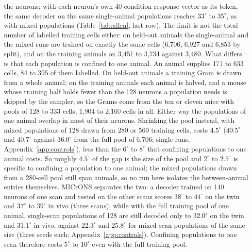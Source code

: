 \documentclass[11pt]{article}
\begin{document}
the neurons: with each neuron's own 40-condition response vector as its token, the same decoder on the same single-animal populations reaches $33^\circ$ to $35^\circ$, as with mixed populations (Table~\ref{tab:allen}, last row). The limit is not the total number of labelled training cells either: on held-out animals the single-animal and the mixed runs are trained on exactly the same cells (6,706, 6,927 and 6,853 by split), and on the training animals on 3,451 to 3,734 against 3,480. What differs is that each population is confined to one animal. An animal supplies 171 to 633 cells, 84 to 395 of them labelled. On held-out animals a training Gram is drawn from a whole animal; on the training animals each animal is halved, and a mouse whose training half holds fewer than the 128 neurons a population needs is skipped by the sampler, so the Grams come from the ten or eleven mice with pools of 128 to 333 cells, 1,904 to 2,160 cells in all. Either way the populations of one animal overlap in most of their neurons. Shrinking the pool instead, with mixed populations of 128 drawn from 280 or 560 training cells, costs $4.5^\circ$ ($40.5^\circ$ and $40.7^\circ$ against $36.0^\circ$ from the full pool of 6,706; single runs, Appendix~\ref{app:controls}), less than the $6^\circ$ to $8^\circ$ that confining populations to one animal costs. So roughly $4.5^\circ$ of the gap is the size of the pool and $2^\circ$ to $2.5^\circ$ is specific to confining a population to one animal; the mixed populations drawn from a 280-cell pool still span animals, so no run here isolates the between-animal entries themselves. MICrONS separates the two: a decoder trained on 140 neurons of one scan and tested on the other scans scores $38^\circ$ to $44^\circ$ on the twin and $37^\circ$ to $39^\circ$ in vivo (three scans), while with the full training pool of one animal, single-scan populations of 128 are still decoded only to $32.0^\circ$ on the twin and $31.1^\circ$ in vivo, against $22.3^\circ$ and $25.8^\circ$ for mixed-scan populations of the same size (three seeds each; Appendix~\ref{app:controls}). Confining populations to one scan therefore costs $5^\circ$ to $10^\circ$ even with the full training pool.
\end{document}
